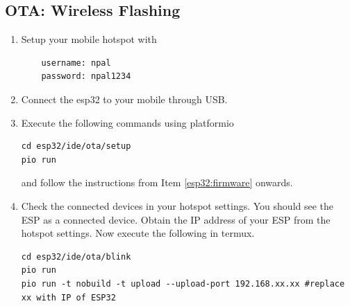 \subsection{OTA: Wireless Flashing}
\begin{enumerate}
	\item Setup your mobile hotspot with 
	\begin{lstlisting}
	username: npal
	password: npal1234
	\end{lstlisting}
	\item Connect the esp32 to your mobile through USB.
	\item Execute the following commands using platformio
	\begin{lstlisting}
cd esp32/ide/ota/setup
pio run
	\end{lstlisting}
	and follow the instructions from Item 
	\ref{esp32:firmware} onwards.
	\item Check the connected devices in your hotspot settings.  You should see the ESP as a connected device.  Obtain the IP address of your ESP from the hotspot settings.
		Now execute the following in termux.
	\begin{lstlisting}
cd esp32/ide/ota/blink
pio run
pio run -t nobuild -t upload --upload-port 192.168.xx.xx #replace xx with IP of ESP32
	\end{lstlisting}
\end{enumerate}

